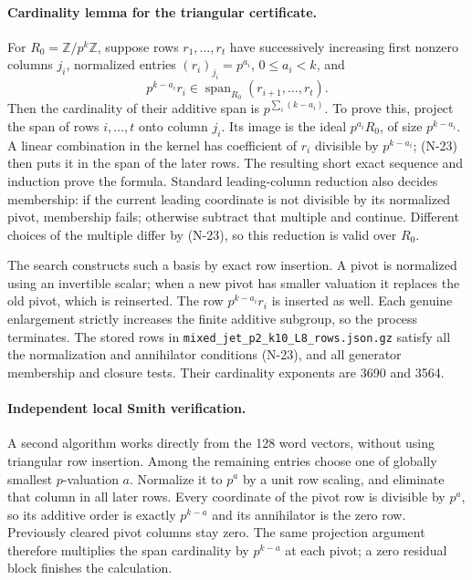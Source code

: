 \paragraph{Cardinality lemma for the triangular certificate.}
For $R_0=\mathbb Z/p^k\mathbb Z$, suppose rows $r_1,\ldots,r_t$
have successively increasing first nonzero columns $j_i$, normalized
entries $(r_i)_{j_i}=p^{a_i}$, $0\le a_i<k$, and
\[
                 p^{k-a_i}r_i\in
                   \operatorname{span}_{R_0}(r_{i+1},\ldots,r_t).
 \tag{N-23}
\]
Then the cardinality of their additive span is
$p^{\sum_i(k-a_i)}$.  To prove this, project the span of rows
$i,\ldots,t$ onto column $j_i$.  Its image is the ideal
$p^{a_i}R_0$, of size $p^{k-a_i}$.  A linear combination in the kernel
has coefficient of $r_i$ divisible by $p^{k-a_i}$; (N-23) then puts
it in the span of the later rows.  The resulting short exact sequence
and induction prove the formula.  Standard leading-column reduction
also decides membership: if the current leading coordinate is not
divisible by its normalized pivot, membership fails; otherwise
subtract that multiple and continue.  Different choices of the
multiple differ by (N-23), so this reduction is valid over $R_0$.

The search constructs such a basis by exact row insertion.  A pivot
is normalized using an invertible scalar; when a new pivot has
smaller valuation it replaces the old pivot, which is reinserted.
The row $p^{k-a_i}r_i$ is inserted as well.  Each genuine enlargement
strictly increases the finite additive subgroup, so the process
terminates.  The stored rows in
\nolinkurl{mixed_jet_p2_k10_L8_rows.json.gz} satisfy all the
normalization and annihilator conditions (N-23), and all generator
membership and closure tests.  Their cardinality exponents are 3690
and 3564.

\paragraph{Independent local Smith verification.}
A second algorithm works directly from the 128 word vectors, without
using triangular row insertion.  Among the remaining entries choose
one of globally smallest $p$-valuation $a$.  Normalize it to $p^a$
by a unit row scaling, and eliminate that column in all later rows.
Every coordinate of the pivot row is divisible by $p^a$, so its
additive order is exactly $p^{k-a}$ and its annihilator is the zero
row.  Previously cleared pivot columns stay zero.  The same projection
argument therefore multiplies the span cardinality by $p^{k-a}$ at
each pivot; a zero residual block finishes the calculation.

